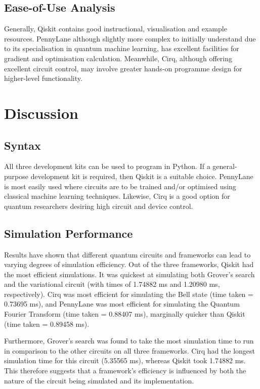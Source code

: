 \documentclass[journal]{IEEEtran}
\begin{document}
\subsection{Ease-of-Use Analysis}
Generally, Qiskit contains good instructional, visualisation and example resources. PennyLane although slightly more complex to initially understand due to its specialisation in quantum machine learning, has excellent facilities for gradient and optimisation calculation. Meanwhile, Cirq, although offering excellent circuit control, may involve greater hands-on programme design for higher-level functionality.

\section{Discussion}

\subsection{Syntax}
All three development kits can be used to program in Python. If a general-purpose development kit is required, then Qiskit is a suitable choice. PennyLane is most easily used where circuits are to be trained and/or optimised using classical machine learning techniques. Likewise, Cirq is a good option for quantum researchers desiring high circuit and device control.

\subsection{Simulation Performance}
Results have shown that different quantum circuits and frameworks can lead to varying degrees of simulation efficiency. Out of the three frameworks, Qiskit had the most efficient simulations. It was quickest at simulating both Grover's search and the variational circuit (with times of 1.74882 ms and 1.20980 ms, respectively). Cirq was most efficient for simulating the Bell state (time taken = 0.73695 ms), and PennyLane was most efficient for simulating the Quantum Fourier Transform (time taken = 0.88407 ms), marginally quicker than Qiskit (time taken = 0.89458 ms).

Furthermore, Grover's search was found to take the most simulation time to run in comparison to the other circuits on all three frameworks. Cirq had the longest simulation time for this circuit (5.35565 ms), whereas Qiskit took 1.74882 ms. This therefore suggests that a framework's efficiency is influenced by both the nature of the circuit being simulated and its implementation.
\end{document}

